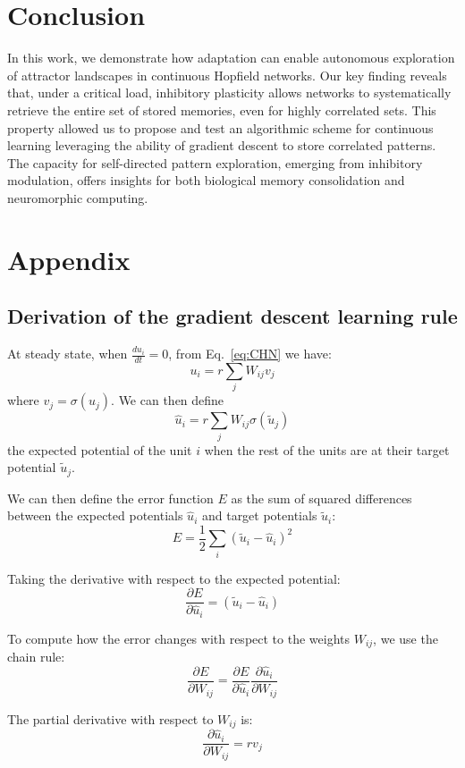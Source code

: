 \documentclass[10pt,letterpaper]{article}
\begin{document}
\newpage
\section{Conclusion}

In this work, we demonstrate how adaptation can enable autonomous exploration of attractor landscapes in continuous Hopfield networks. Our key finding reveals that, under a critical load, inhibitory plasticity allows networks to systematically retrieve the entire set of stored memories, even for highly correlated sets. This property allowed us to propose and test an algorithmic scheme for continuous learning leveraging the ability of gradient descent to store correlated patterns. The capacity for self-directed pattern exploration, emerging from inhibitory modulation, offers insights for both biological memory consolidation and neuromorphic computing. 

\section{Appendix}

\subsection{Derivation of the gradient descent learning rule}
\label{app:gradient}

At steady state, when $\frac{du_i}{dt} = 0$, from Eq.~\ref{eq:CHN} we have:
\[u_i = r \sum_j W_{ij} v_j\]
where $v_j = \sigma(u_j)$. We can then define
\[\hat{u}_i= r \sum_j W_{ij} \sigma(\tilde{u}_j)\]
the expected potential of the unit $i$ when the rest of the units are at their target potential $\tilde{u}_j$. 

We can then define the error function $E$ as the sum of squared differences between the expected potentials $\hat{u}_i$ and target potentials $\tilde{u}_i$:
\[E = \frac{1}{2} \sum_i (\tilde{u}_i-\hat{u}_i)^2\]

Taking the derivative with respect to the expected potential:
\[\frac{\partial E}{\partial \hat{u}_i} = (\tilde{u}_i - \hat{u}_i)\]

To compute how the error changes with respect to the weights $W_{ij}$, we use the chain rule:
\[\frac{\partial E}{\partial W_{ij}} = \frac{\partial E}{\partial \hat{u}_i} \frac{\partial \hat{u}_i}{\partial W_{ij}}\]

The partial derivative with respect to $W_{ij}$ is:
\[\frac{\partial \hat{u}_i}{\partial W_{ij}} = rv_j\]
\end{document}
